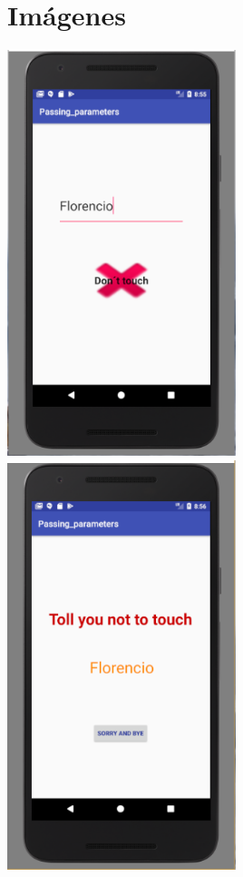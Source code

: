 \documentclass{report}
\begin{document}
\chapter{Im\'{a}genes}
\includegraphics[width=0.5\textwidth]{../images/param_1.PNG}
\includegraphics[width=0.5\textwidth]{../images/param_2.PNG}
\end{document}
